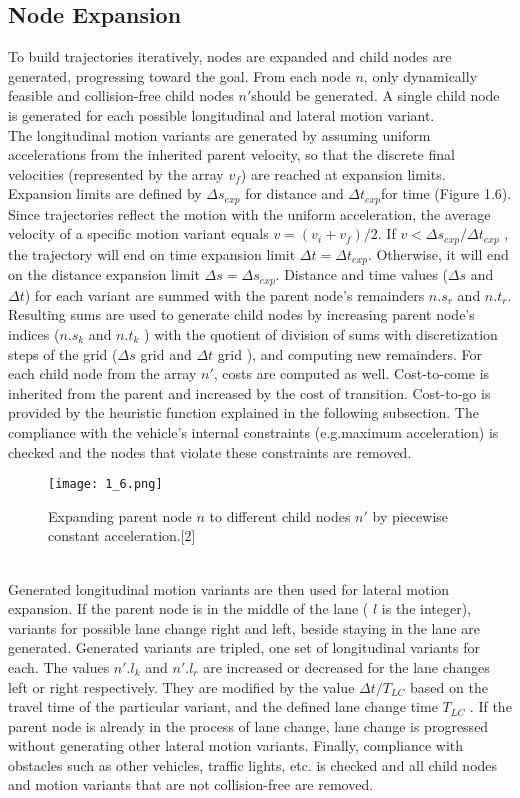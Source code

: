 \documentclass{report}
\begin{document}
\subsection{Node Expansion}
To build trajectories iteratively, nodes are expanded and child nodes are generated, progressing toward the goal. From each node $n$, only dynamically feasible and collision-free child nodes $n'$should be generated. A single child node is generated for each possible longitudinal and lateral motion variant.\\
\indent
The longitudinal motion variants are generated by assuming uniform accelerations from the inherited parent velocity, so that the discrete final velocities (represented by the array $v_f$) are reached at expansion limits. Expansion limits are defined by $ \Delta s_{exp}$ for distance and $\Delta t_{exp} $for time (Figure 1.6). Since trajectories reflect the motion with the uniform acceleration, the average velocity of a specific motion variant equals $v = (v_i + v_f ) /2$. If $v < \Delta s_{exp} /\Delta t_{exp}$ , the trajectory will end on time expansion limit $\Delta t = \Delta t_{exp}$. Otherwise,
it will end on the distance expansion limit $\Delta s = \Delta s_{exp}$. Distance and time values ($\Delta s$ and $\Delta t$) for each variant are summed with the parent node’s remainders $n.s_r$ and $n.t_r$. Resulting sums are used to generate child nodes by increasing parent node’s indices ($n.s_k$ and $n.t_k$ ) with the quotient of division of sums with discretization steps of the grid ($\Delta s$ grid and $\Delta t$ grid ), and computing new remainders. For each child node from the array $n'$, costs are computed as well. Cost-to-come is inherited from the parent and increased by the cost of transition. Cost-to-go is provided by the heuristic function explained in the following subsection. The compliance with the vehicle’s internal constraints (e.g.maximum acceleration) is checked and the nodes that violate these constraints are removed.
   \begin{figure}[ht]
	\centering
	\texttt{[image: 1\_6.png]}
	\caption{Expanding parent node $n$ to different child nodes $n'$ by piecewise constant acceleration.[2]}
	\label{fig:1.6} 
\end{figure}\\
\indent
Generated longitudinal motion variants are then used for lateral motion expansion. If the parent node is in the middle of the lane ( $l$ is the integer), variants for possible lane change right and left, beside staying in the lane are generated. Generated variants are tripled, one set of longitudinal variants for each. The values $n'.l_k$ and $n'.l_r$ are increased or decreased for the lane changes left or right respectively. They are modified by the value $\Delta t/T_{LC}$ based on the travel time of the particular variant, and the defined lane change time $T_{LC}$ . If the parent node is already in the process of lane change, lane change is progressed without generating other lateral motion variants. Finally, compliance with obstacles such as other vehicles, traffic lights, etc. is checked and all child nodes and motion variants that are not collision-free are removed.
\end{document}
